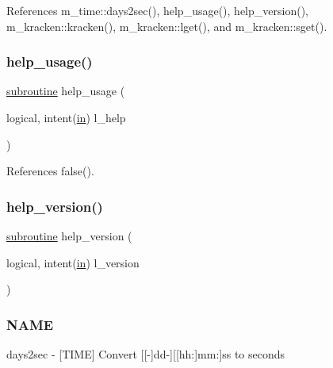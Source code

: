 References m\+\_\+time\+::days2sec(), help\+\_\+usage(), help\+\_\+version(), m\+\_\+kracken\+::kracken(), m\+\_\+kracken\+::lget(), and m\+\_\+kracken\+::sget().

\mbox{\label{days2sec_8f90_a3e09a3b52ee8fb04eeb93fe5761626a8}} 
\subsubsection{\texorpdfstring{help\+\_\+usage()}{help\_usage()}}
{\footnotesize\ttfamily \hyperlink{M__stopwatch_83_8txt_acfbcff50169d691ff02d4a123ed70482}{subroutine} help\+\_\+usage (\begin{DoxyParamCaption}\item[{logical, intent(\hyperlink{M__journal_83_8txt_afce72651d1eed785a2132bee863b2f38}{in})}]{l\+\_\+help }\end{DoxyParamCaption})}



References false().

\mbox{\label{days2sec_8f90_a39c21619b08a3c22f19e2306efd7f766}} 
\subsubsection{\texorpdfstring{help\+\_\+version()}{help\_version()}}
{\footnotesize\ttfamily \hyperlink{M__stopwatch_83_8txt_acfbcff50169d691ff02d4a123ed70482}{subroutine} help\+\_\+version (\begin{DoxyParamCaption}\item[{logical, intent(\hyperlink{M__journal_83_8txt_afce72651d1eed785a2132bee863b2f38}{in})}]{l\+\_\+version }\end{DoxyParamCaption})}



\subsubsection*{N\+A\+ME}

days2sec -\/ \mbox{[}T\+I\+ME\mbox{]} Convert \mbox{[}\mbox{[}-\/\mbox{]}dd-\/\mbox{]}\mbox{[}\mbox{[}hh\+:\mbox{]}mm\+:\mbox{]}ss to seconds 

